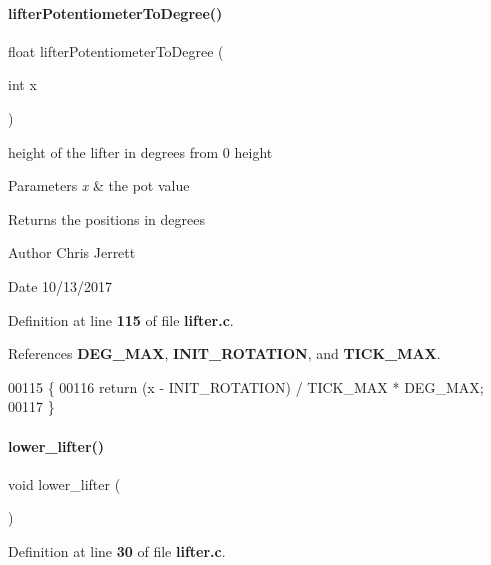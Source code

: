\paragraph{lifter\+Potentiometer\+To\+Degree()}
{\footnotesize\ttfamily float lifter\+Potentiometer\+To\+Degree (\begin{DoxyParamCaption}\item[{int}]{x }\end{DoxyParamCaption})}



height of the lifter in degrees from 0 height 


\begin{DoxyParams}{Parameters}
{\em x} & the pot value \\
\hline
\end{DoxyParams}
\begin{DoxyReturn}{Returns}
the positions in degrees 
\end{DoxyReturn}
\begin{DoxyAuthor}{Author}
Chris Jerrett 
\end{DoxyAuthor}
\begin{DoxyDate}{Date}
10/13/2017 
\end{DoxyDate}


Definition at line \textbf{ 115} of file \textbf{ lifter.\+c}.



References \textbf{ D\+E\+G\+\_\+\+M\+AX}, \textbf{ I\+N\+I\+T\+\_\+\+R\+O\+T\+A\+T\+I\+ON}, and \textbf{ T\+I\+C\+K\+\_\+\+M\+AX}.


\begin{DoxyCode}
00115                                         \{
00116   \textcolor{keywordflow}{return} (x - INIT_ROTATION) / TICK_MAX * DEG_MAX;
00117 \}
\end{DoxyCode}
\mbox{\label{lifter_8c_aa7d2d04059f57cc5b8582f6fd0726dc1}} 
\paragraph{lower\+\_\+lifter()}
{\footnotesize\ttfamily void lower\+\_\+lifter (\begin{DoxyParamCaption}{ }\end{DoxyParamCaption})}



Definition at line \textbf{ 30} of file \textbf{ lifter.\+c}.



